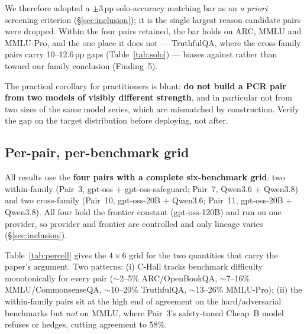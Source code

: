 \documentclass[conference]{IEEEtran}
\begin{document}
We therefore adopted a $\pm3$\,pp solo-accuracy matching bar as an \textit{a
priori} screening criterion (\S\ref{sec:inclusion}); it is the single largest
reason candidate pairs were dropped. Within the four pairs retained, the bar
holds on ARC, MMLU and MMLU-Pro, and the one place it does not --- TruthfulQA,
where the cross-family pairs carry 10--12.6\,pp gaps (Table~\ref{tab:solo}) ---
biases against rather than toward our family conclusion (Finding~5).

The practical corollary for practitioners is blunt: \textbf{do not build a PCR
pair from two models of visibly different strength}, and in particular not from
two sizes of the same model series, which are mismatched by construction. Verify
the gap on the target distribution before deploying, not after.

\subsection{Per-pair, per-benchmark grid}
All results use the \textbf{four pairs with a complete six-benchmark
grid}: two within-family (Pair~3, gpt-oss + gpt-oss-safeguard; Pair~7, Qwen3.6 +
Qwen3.8) and two cross-family (Pair~10, gpt-oss-20B + Qwen3.6; Pair~11,
gpt-oss-20B + Qwen3.8). All four hold the frontier constant (gpt-oss-120B) and
run on one provider, so provider and frontier are controlled and only lineage
varies (\S\ref{sec:inclusion}).

Table~\ref{tab:percell} gives the $4\times6$ grid for the two quantities that
carry the paper's argument. Two patterns: (i) C-Hall tracks benchmark difficulty
monotonically for every pair ($\sim$2--5\% ARC/OpenBookQA, $\sim$7--16\%
MMLU/CommonsenseQA, $\sim$10--20\% TruthfulQA, $\sim$13--26\% MMLU-Pro); (ii) the
within-family pairs sit at the high end of agreement on the hard/adversarial
benchmarks but \textit{not} on MMLU, where Pair~3's safety-tuned Cheap~B model
refuses or hedges, cutting agreement to 58\%.
\end{document}
